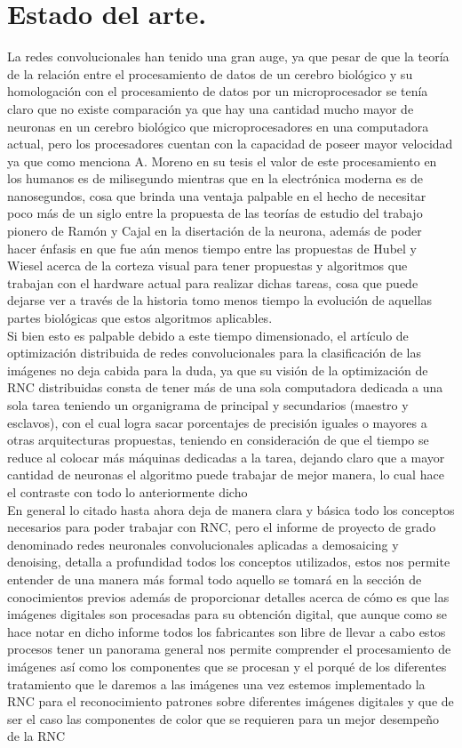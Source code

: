 \documentclass[a4paper, 12pt]{article}
\begin{document}
    \section{Estado del arte.} 
    La redes convolucionales han tenido una gran auge, ya que pesar de que la teoría de la relación entre el procesamiento de datos de un cerebro biológico y su homologación con el procesamiento de datos por un microprocesador se tenía claro que no existe comparación ya que hay una cantidad mucho mayor de neuronas en un cerebro biológico que microprocesadores en una computadora actual, pero los procesadores cuentan con la capacidad de poseer mayor velocidad ya que como menciona A. Moreno en su tesis el valor de este procesamiento en los humanos es de milisegundo mientras que en la electrónica moderna es de nanosegundos, cosa que brinda una ventaja palpable en el hecho de necesitar poco más de un siglo entre la propuesta de las teorías de estudio del trabajo pionero de Ramón y Cajal en la disertación de la neurona, además de poder hacer énfasis en que fue aún menos tiempo entre las propuestas de Hubel y Wiesel acerca de la corteza visual para tener propuestas y algoritmos que trabajan con el hardware actual para realizar dichas tareas, cosa que puede dejarse ver a través de la historia tomo menos tiempo la evolución de aquellas partes biológicas que estos algoritmos aplicables\cite{artola2019clasificacion}.\\ 
    Si bien esto es palpable debido a este tiempo dimensionado, el artículo de optimización distribuida de redes convolucionales para la clasificación de las imágenes no deja cabida para la duda, ya que su visión de la optimización de RNC distribuidas consta de tener más de una sola computadora dedicada a una sola tarea teniendo un organigrama de principal y secundarios (maestro y esclavos), con el cual logra sacar porcentajes de precisión iguales o mayores a otras arquitecturas propuestas, teniendo en consideración de que el tiempo se reduce al colocar más máquinas dedicadas a la tarea, dejando claro que a mayor cantidad de neuronas el algoritmo puede trabajar de mejor manera, lo cual hace el contraste con todo lo anteriormente dicho\cite{hernandez2019optimizacion}\\ 
    En general lo citado hasta ahora deja de manera clara y básica todo los conceptos necesarios para poder trabajar con RNC, pero el informe de proyecto de grado denominado redes neuronales convolucionales aplicadas a demosaicing y denoising, detalla a profundidad todos los conceptos utilizados, estos nos permite entender de una manera más formal todo aquello se tomará en la sección de conocimientos previos además de proporcionar detalles acerca de cómo es que las imágenes digitales son procesadas para su obtención digital, que aunque como se hace notar en dicho informe todos los fabricantes son libre de llevar a cabo estos procesos tener un panorama general nos permite comprender el procesamiento de imágenes así como los componentes que se procesan y el porqué de los diferentes tratamiento que le daremos a las imágenes una vez estemos implementado la RNC para el reconocimiento patrones sobre diferentes imágenes digitales y que de ser el caso las componentes de color que se requieren para un mejor desempeño de la RNC\cite{balduvin2019redes} 
\end{document}
